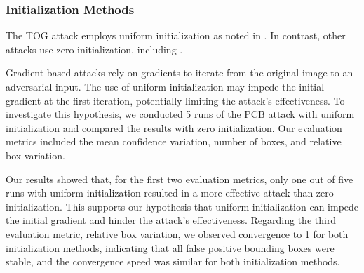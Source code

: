 


\subsubsection{Initialization Methods}

The TOG attack employs uniform initialization as noted in \cite{chow2020adversarial}. In contrast, other attacks use zero initialization, including \cite{fischer2017adversarial,li2021universal,mohamad2021,madry2017towards}. 

Gradient-based attacks rely on gradients to iterate from the original image to an adversarial input. The use of uniform initialization may impede the initial gradient at the first iteration, potentially limiting the attack's effectiveness. To investigate this hypothesis, we conducted 5 runs of the PCB attack with uniform initialization and compared the results with zero initialization. Our evaluation metrics included the mean confidence variation, number of boxes, and relative box variation.

Our results showed that, for the first two evaluation metrics, only one out of five runs with uniform initialization resulted in a more effective attack than zero initialization. This supports our hypothesis that uniform initialization can impede the initial gradient and hinder the attack's effectiveness. Regarding the third evaluation metric, relative box variation, we observed convergence to 1 for both initialization methods, indicating that all false positive bounding boxes were stable, and the convergence speed was similar for both initialization methods.



